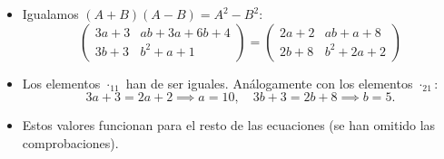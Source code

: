 \documentclass[a4paper,12pt]{article}
\begin{document}
\begin{ejercicio}[title=Ejercicio 2]
\begin{itemize}
\[    =
    \begin{pmatrix}
    2a+2 & ab+a+8\\
    2b+8 & b^2+2a+2
    \end{pmatrix}
    \]
    \item Igualamos $(A+B)(A-B) = A^2-B^2$:
    \[
    \begin{pmatrix}
    3a+3 & ab+3a+6b+4\\
    3b+3 & b^2+a+1
    \end{pmatrix} = 
    \begin{pmatrix}
    2a+2 & ab+a+8\\
    2b+8 & b^2+2a+2
    \end{pmatrix}
    \]
    \item Los elementos ${\cdot}_{11}$ han de ser iguales. Análogamente con los elementos ${\cdot}_{21}$:
    \[
    3a+3 = 2a+2 \implies \boxed{a=10}, \quad
    3b+3 = 2b+8 \implies \boxed{b=5}.
    \]
    \item Estos valores funcionan para el resto de las ecuaciones (se han omitido las comprobaciones).
\end{itemize}

\end{ejercicio}
\end{document}
